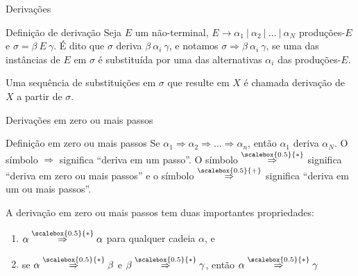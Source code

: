 \begin{frame}[fragile]{Derivações}

    \begin{block}{Definição de derivação}
        Seja $E$ um não-terminal, $E\to \alpha_1\ |\ \alpha_2\ |\ \ldots \ |\ \alpha_N$ produções-$E$ e $\sigma = \beta\ E\ \gamma$. É dito que $\sigma$ deriva 
            $\beta\ \alpha_i\ \gamma$, e notamos $\sigma \Rightarrow \beta\ \alpha_i\ \gamma$, se uma das instâncias de $E$ em $\sigma$ é substituída por uma
            das alternativas $\alpha_i$ das produções-$E$.

        \vspace{0.1in}

        Uma sequência de substituições em $\sigma$ que resulte em $X$ é chamada derivação de $X$ a partir de $\sigma$.
    \end{block}

\end{frame}

\begin{frame}[fragile]{Derivações em zero ou mais passos}

    \begin{block}{Definição em zero ou mais passos}
        Se $\alpha_1 \Rightarrow \alpha_2 \Rightarrow \ldots \Rightarrow \alpha_n$, então $\alpha_1$ deriva $\alpha_N$. O símbolo $\Rightarrow$ significa
        ``deriva em um passo''. O símbolo $\overset{\scalebox{0.5}{*}}{\Rightarrow}$ significa ``deriva em zero ou mais passos'' e o símbolo  $\overset{\scalebox{0.5}{+}}{\Rightarrow}$ significa
        ``deriva em um ou mais passos''.
    
        \vspace{0.1in}

        A derivação em zero ou mais passos tem duas importantes propriedades:
        \begin{enumerate}
            \item $\alpha \overset{\scalebox{0.5}{*}}{\Rightarrow} \alpha$ para qualquer cadeia $\alpha$, e
            \item se $\alpha \overset{\scalebox{0.5}{*}}{\Rightarrow} \beta$ e $\beta \overset{\scalebox{0.5}{*}}{\Rightarrow} \gamma$, então $\alpha \overset{\scalebox{0.5}{*}}{\Rightarrow} \gamma$ 
        \end{enumerate}
    \end{block}

\end{frame}

